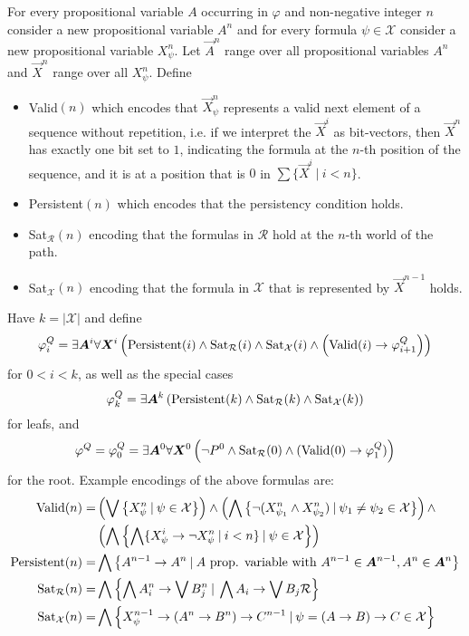 \documentclass[runningheads]{llncs}
\begin{document}
\begin{definition}
	For every propositional variable $A$ occurring in $\varphi$ and non-negative integer $n$ consider a new propositional variable $A^n$ and for every formula $\psi\in\mathcal X$ consider a new propositional variable $X_\psi^n$. Let $\vec A^n$ range over all propositional variables $A^n$ and $\vec X^n$ range over all $X_\psi^n$. Define
	\begin{itemize}
		\item {\normalfont Valid}$(n)$ which encodes that $\vec X^n_\psi$ represents a valid next element of a sequence without repetition, i.e. if we interpret the $\vec X^i$ as bit-vectors, then $\vec X^n$ has exactly one bit set to $1$, indicating the formula at the $n$-th position of the sequence, and it is at a position that is $0$ in $\sum\{\vec X^i\:|\:i < n\}$.
		\item {\normalfont Persistent}$(n)$ which encodes that the persistency condition holds.
		\item {\normalfont Sat}$_{\mathcal R}(n)$ encoding that the formulas in $\mathcal R$ hold at the $n$-th world of the path.
		\item {\normalfont Sat}$_{\mathcal X}(n)$ encoding that the formula in $\mathcal X$ that is represented by $\vec X^{n-1}$ holds.
	\end{itemize}
	Have $k = |\mathcal X|$ and define$$\varphi^Q_{i} = \exists \vec A^i\forall \vec X^i\left(\text{\normalfont Persistent}(i)\wedge \text{\normalfont Sat}_{\mathcal R}(i)\wedge \text{\normalfont Sat}_{\mathcal X}(i)\wedge\left(\text{\normalfont Valid}(i)\to \varphi^Q_{i+1}\right)\right)$$
	for $0 < i < k$, as well as the special cases
	$$\varphi^Q_{k} = \exists \vec A^k\left(\text{\normalfont Persistent}(k)\wedge \text{\normalfont Sat}_{\mathcal R}(k)\wedge \text{\normalfont Sat}_{\mathcal X}(k)\right)$$
	for leafs, and $$\varphi^Q = \varphi_0^Q = \exists \vec A^0\forall \vec X^0\left(\neg P^0\wedge \text{\normalfont Sat}_{\mathcal R}(0)\wedge(\text{\normalfont Valid}(0)\to \varphi_1^Q)\right)$$for the root.
	Example encodings of the above formulas are:
	\begin{align*}
		\text{\normalfont Valid}(n) = &\left(\bigvee\left\{X^n_\psi\:|\:\psi\in\mathcal X\right\}\right)\wedge\left(\bigwedge \left\{\neg(X^n_{\psi_1}\wedge X^n_{\psi_2})\:|\:\psi_1\neq\psi_2\in\mathcal X\right\}\right)\wedge\\&\left(\bigwedge\left\{\bigwedge\{X^i_\psi\to\neg X^n_\psi\:|\:i < n\}\:|\:\psi\in\mathcal X\right\}\right)\\
		\text{\normalfont Persistent}(n) = & \bigwedge\left\{A^{n-1}\to A^n\:|\: A \text{ prop. variable with }A^{n-1}\in\vec A^{n-1}, A^n \in\vec A^{n}\right\}\\
		\text{\normalfont Sat}_{\mathcal R}(n) = &\bigwedge\left\{\bigwedge A^n_i\to\bigvee B^n_j\:|\:\bigwedge A_i\to\bigvee B_j\mathcal R\right\}\\
		\text{\normalfont Sat}_{\mathcal X}(n) = & \bigwedge\left\{X^{n-1}_\psi\to (A^n\to B^n)\to C^{n-1}\:|\:\psi = (A\to B)\to C\in\mathcal X\right\}
	\end{align*}
\end{definition}
\end{document}
